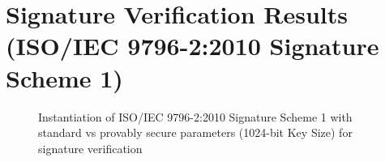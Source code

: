 \documentclass[]{final_report}
\theoremstyle{definition}
\begin{document}

\section{Signature Verification Results (ISO/IEC 9796-2:2010 Signature Scheme 1)}

\begin{figure}[H]
    \centering %
     \caption{Instantiation of ISO/IEC 9796-2:2010 Signature Scheme 1 with standard vs provably secure parameters (1024-bit Key Size) for signature verification}
    \begin{minipage}{\textwidth}
        \centering
    \end{minipage}
       \label{iso_verify_1024bit_table}
  \end{figure}
  
\end{document}
